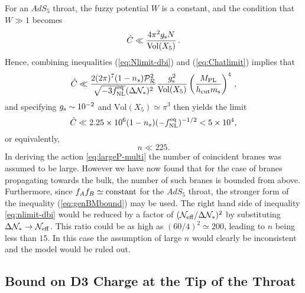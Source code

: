 For an $AdS_5$ throat, the fuzzy potential $W$ is a constant,
and the condition that $W \gg 1$ becomes 
% 
\begin{equation}
\label{eq:Chatlimit}
\hat{C} \ll \frac{4\pi^2g_\mathrm{s} N}{\mathrm{Vol}(X_5)} \,.
\end{equation}
% 
Hence, combining inequalities 
(\ref{eq:Nlimit-dbi}) and (\ref{eq:Chatlimit}) implies that
%  
\begin{equation}
\label{eq:nlimit-dbi}
\hat{C} \ll 
\frac{2 (2\pi)^7 (1-n_s)\mathcal{P}_{\mathcal{R}}^2 }{\sqrt{-3f_{\mathrm{NL}}^{\mathrm{eq}}} ( \Delta \mathcal{N}_*)^2}
\frac{g_\mathrm{s}^2}{\mathrm{Vol} (X_5) }
\left( \frac{M_{\mathrm{PL}}}{h_{\rm cut}m_\mathrm{s}} \right)^4  \,,
\end{equation}
% 
and specifying $g_\mathrm{s} \sim 10^{-2}$ and 
$\mathrm{Vol}(X_5) \simeq \pi^3$ then yields the limit  
% 
\begin{equation}
\hat{C} \ll 2.25\times 10^{6} (1-n_s)(-f_{\mathrm{NL}}^{\mathrm{eq}})^{-1/2} < 5\times 10^4,
\end{equation}
% 
 or equivalently,
%   
\begin{equation}
\label{eq:nbound-multi}
n \ll 225.
\end{equation}
% 
In deriving the action \eqref{eq:largeP-multi} the number of coincident branes was assumed to be
large. However we have now found that for the case of branes propagating towards the bulk, the
number of such branes is bounded from above.
Furthermore, since $f_Af_B \simeq {\rm constant}$ for the $AdS_5$ throat, 
the stronger form of the inequality (\ref{eq:genBMbound}) may be used. The right hand side of
inequality \eqref{eq:nlimit-dbi} would be reduced by a factor of $(   \mathcal{N}_\mathrm{eff} /\Delta \mathcal{N}_*)^2$ by
substituting 
$\Delta \mathcal{N}_* \rightarrow \mathcal{N}_\mathrm{eff}$. This ratio 
could be as high as $(60/4)^2 \simeq 200 $, leading to $n$ being less than $15$. In this case
the assumption of large $n$ would clearly be inconsistent and the model would be ruled out. 

\subsection{Bound on D3 Charge at the Tip of the Throat}

